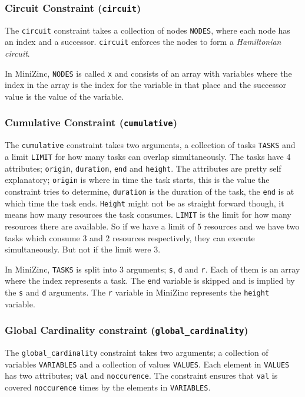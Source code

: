 \subsubsection{Circuit Constraint (\texttt{circuit})}
The \texttt{circuit} constraint takes a collection of nodes \texttt{NODES}, where each node has an index and a successor. \texttt{circuit} enforces the nodes to form a \emph{Hamiltonian circuit}.

In MiniZinc, \texttt{NODES} is called \texttt{x} and consists of an array with variables where the index in the array is the index for the variable in that place and the successor value is the value of the variable.

\subsubsection{Cumulative Constraint (\texttt{cumulative})}
The \texttt{cumulative} constraint takes two arguments, a collection of tasks \texttt{TASKS} and a limit \texttt{LIMIT} for how many tasks can overlap simultaneously. The tasks have 4 attributes; \texttt{origin}, \texttt{duration}, \texttt{end} and \texttt{height}. The attributes are pretty self explanatory; \texttt{origin} is where in time the task starts, this is the value the constraint tries to determine, \texttt{duration} is the duration of the task, the \texttt{end} is at which time the task ends. \texttt{Height} might not be as straight forward though, it means how many resources the task consumes. \texttt{LIMIT} is the limit for how many resources there are available. So if we have a limit of $5$ resources and we have two tasks which consume $3$ and $2$ resources respectively, they can execute simultaneously. But not if the limit were $3$.

In MiniZinc, \texttt{TASKS} is split into $3$ arguments; \texttt{s}, \texttt{d} and \texttt{r}. Each of them is an array where the index represents a task. The \texttt{end} variable is skipped and is implied by the \texttt{s} and \texttt{d} arguments. The \texttt{r} variable in MiniZinc represents the \texttt{height} variable.

\subsubsection{Global Cardinality constraint (\texttt{global\_cardinality})}
The \texttt{global\_cardinality} constraint takes two arguments; a collection of variables \texttt{VARIABLES} and a collection of values \texttt{VALUES}. Each element in \texttt{VALUES} has two attributes; \texttt{val} and \texttt{noccurence}. The constraint ensures that \texttt{val} is covered \linebreak\texttt{noccurence} times by the elements in \texttt{VARIABLES}.

